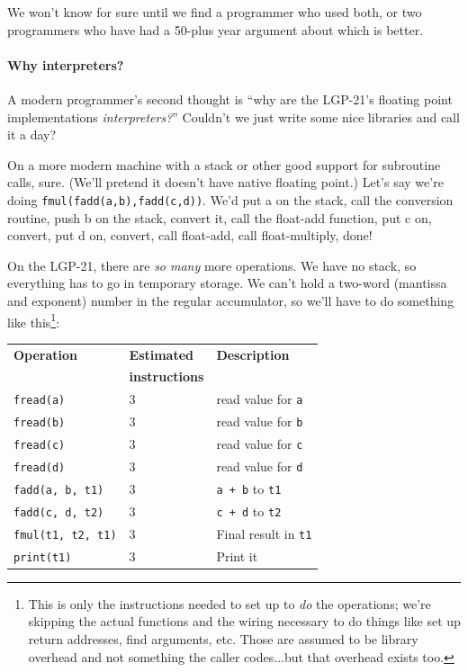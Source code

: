 We won't know for sure until we find a programmer who used both, or two programmers who have had a 50-plus year argument about which is better.

\paragraph{Why interpreters?}
A modern programmer's second thought is ``why are the LGP-21's floating point implementations \emph{interpreters?}'' Couldn't we just write some nice libraries and call it a day?

On a more modern machine with a stack or other good support for subroutine calls, sure. (We'll pretend it doesn't have native floating point.) Let's say we're doing \texttt{fmul(fadd(a,b),fadd(c,d))}. We'd put a on the stack, call the conversion routine, push b on the stack, convert it, call the float-add function, put c on, convert, put d on, convert, call float-add, call float-multiply, done!

On the LGP-21, there are \emph{so many} more operations. We have no stack, so everything has to go in temporary storage. We can't hold a two-word (mantissa and exponent) number in the regular accumulator, so we'll have to do something like this\footnote{This is only the instructions needed to set up to \emph{do} the operations; we're skipping the actual functions and the wiring necessary to do things like set up return addresses, find arguments, etc. Those are assumed to be library overhead and not something the caller codes...but that overhead exists too.}:

\begin{tabularx}{\textwidth}{llX}
	\textbf{Operation} & \textbf{Estimated} & \textbf{Description} \\
	                   & \textbf{instructions} & \\
	\texttt{fread(a)} & 3 & read value for \texttt{a} \\
	\texttt{fread(b)} & 3 & read value for \texttt{b} \\
	\texttt{fread(c)} & 3 & read value for \texttt{c} \\
	\texttt{fread(d)} & 3 & read value for \texttt{d} \\
    \texttt{fadd(a, b, t1)} & 3 & \texttt{a + b} to \texttt{t1}\\
    \texttt{fadd(c, d, t2)} & 3 & \texttt{c + d} to \texttt{t2}\\
	\texttt{fmul(t1, t2, t1)} & 3 & Final result in \texttt{t1}\\
	\texttt{print(t1)} & 3 & Print it	\\
\end{tabularx}

